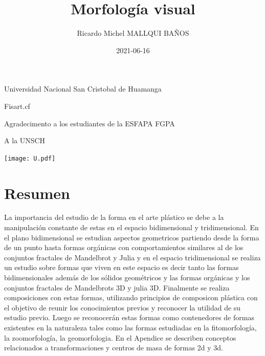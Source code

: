 \documentclass[
  16pt,
]{krantz}
\title{Morfología visual}
\author{Ricardo Michel MALLQUI BAÑOS}
\date{2021-06-16}
\theoremstyle{definition}
\theoremstyle{definition}
\theoremstyle{definition}
\theoremstyle{definition}
\theoremstyle{remark}
\begin{document}
\maketitle

\thispagestyle{empty}
\begin{flushright}
Universidad Nacional San Cristobal de Huamanga

Fisart.cf

Agradecimento a los estudiantes de la ESFAPA FGPA

A la UNSCH

\texttt{[image: U.pdf]}
\end{flushright}

{
\hypersetup{linkcolor=}
\setcounter{tocdepth}{2}
\tableofcontents
}
\listoftables
\listoffigures
\newcommand{\N}{\mathbb{N}}
\newcommand{\R}{\mathbb{R}}
\newcommand{\CC}{\mathbb{C}}
\newcommand{\I}{\mathbb{I}}
\newcommand{\f}{\mathbb{f}}
\newcommand{\X}{\mathbb{X}}
\newcommand{\D}{\mathbb{D}}
\newcommand{\Z}{\mathbb{Z}}
\newcommand{\Q}{\mathbb{Q}}
\newcommand{\norm}[1]{\left\Vert#1\right\Vert}
\newcommand{\abs}[1]{\left\vert#1\right\vert}
\newcommand{\set}[1]{\left\{#1\right\}}
\newcommand{\seq}[1]{\left<#1\right>}
\newcommand{\co}[1]{\left[#1\right]}
\newcommand{\cc}[1]{\left(#1\right)}
\newcommand{\J}{\mathcal{J}}
\newcommand{\K}{\mathcal{K}}
\newcommand{\M}{\mathcal{M}}
\newcommand{\F}{\mathcal{F}}

\hypertarget{resumen}{%
\chapter*{Resumen}\label{resumen}}


La importancia del estudio de la forma en el arte plástico se debe a la manipulación constante de estas en el espacio bidimensional y tridimensional. En el plano bidimensional se estudian aspectos geometricos partiendo desde la forma de un punto hasta formas orgánicas con comportamientos similares al de los conjuntos fractales de Mandelbrot y Julia y en el espacio tridimensional se realiza un estudio sobre formas que viven en este espacio es decir tanto las formas bidimensionales además de los sólidos geométricos y las formas orgánicas y los conjuntos fractales de Mandelbrots 3D y julia 3D. Finalmente se realiza composiciones con estas formas, utilizando principios de composicon plástica con el objetivo de reunir los conocimientos previos y reconocer la utilidad de su estudio previo. Luego se reconocerán estas formas como contenedores de formas existentes en la naturaleza tales como las formas estudiadas en la fitomorfología, la zoomorfología, la geomorfologia. En el Apendice se describen conceptos relacionados a transformaciones y centros de masa de formas 2d y 3d.
\end{document}
